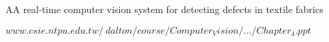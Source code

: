 \documentclass[DIV=calc, paper=a4, fontsize=12pt, twocolumn]{scrartcl}	 %
\begin{document}
\clearpage
\newpage

\begin{thebibliography}{99} %

\newblock AA real-time computer vision system for detecting defects in textile fabrics
 
\newblock $www.csie.ntpu.edu.tw/~dalton/course/Computer_Vision/.../Chapter_4.ppt$ 




\end{thebibliography}

\end{document}
